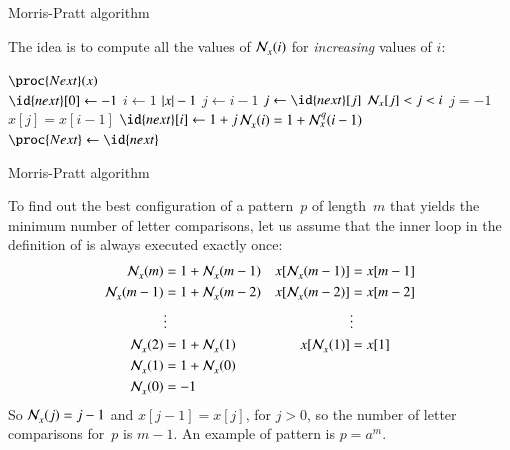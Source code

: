 %
\begin{frame}{Morris-Pratt algorithm}

The idea is to compute all the values of \(\mathcal{N}_{x}^{}(i)\) for \emph{increasing} values of \(i\):
\begin{codebox}
\(\proc{Next}(x)\)\\
\li \(\id{next}[0] \gets -1\)
\li \For \(i \gets 1\) \To \(\left\lvert\smash{x}\right\rvert - 1\) 
\li \> \(j \gets i - 1\)
\li \> \Repeat
\li       \(j \gets \id{next}[j]\)\RComment
\(\mathcal{N}_{x}[j] < j < i\)
\li       \Until \(j = -1\) \LogOr \(x[j] = x[i-1]\)
\li \> \(\id{next}[i] \gets 1 + j\)\RComment \(\mathcal{N}_{x}^{}(i)
= 1 + \mathcal{N}_{x}^{q}(i-1)\)
    \End
\li \(\proc{Next} \gets \id{next}\)
\end{codebox}

\end{frame}

%
\begin{frame}{Morris-Pratt algorithm}

To find out the best configuration of a pattern~\(p\) of length~\(m\)
that yields the minimum number of letter comparisons, let us assume
that the inner loop in the definition of  is always
executed exactly once:
\begin{align*}
  \mathcal{N}_{x}^{}(m) &= 1 + \mathcal{N}_{x}^{}(m-1) &
  x[\mathcal{N}_{x}^{}(m-1)] &= x[m-1]\\
  \mathcal{N}_{x}^{}(m-1) &= 1 + \mathcal{N}_{x}^{}(m-2) &
  x[\mathcal{N}_{x}^{}(m-2)] &= x[m-2]\\
                     & \vdots & &\vdots \\
  \mathcal{N}_{x}^{}(2) &= 1 + \mathcal{N}_{x}^{}(1) &
  x[\mathcal{N}_{x}^{}(1)] &= x[1]\\
  \mathcal{N}_{x}^{}(1) &= 1 + \mathcal{N}_{x}^{}(0)\\
  \mathcal{N}_{x}^{}(0) &= -1
\end{align*}
So \(\mathcal{N}_{x}^{}(j) = j - 1\) and \(x[j-1] = x[j]\), for \(j >
0\), so the number of letter comparisons for~\(p\) is \(m-1\). An
example of pattern is \(p=a^{m}\).

\end{frame}

